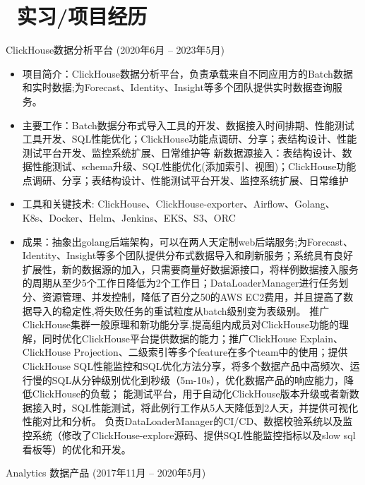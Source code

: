 \documentclass{resume}
\begin{document}
\section{\faUsers\ 实习/项目经历}
ClickHouse数据分析平台 (2020年6月 -- 2023年5月)
\begin{itemize}
  \item 项目简介：ClickHouse数据分析平台，负责承载来自不同应用方的Batch数据和实时数据;为Forecast、Identity、Insight等多个团队提供实时数据查询服务。
  \item 主要工作：Batch数据分布式导入工具的开发、数据接入时间排期、性能测试工具开发、SQL性能优化；ClickHouse功能点调研、分享；表结构设计、性能测试平台开发、监控系统扩展、日常维护等
  新数据源接入：表结构设计、数据性能测试、schema升级、SQL性能优化(添加索引、视图)；ClickHouse功能点调研、分享；表结构设计、性能测试平台开发、监控系统扩展、日常维护
  \item 工具和关键技术: ClickHouse、ClickHouse-exporter、Airflow、Golang、K8s、Docker、Helm、Jenkins、EKS、S3、ORC
  \item 成果：抽象出golang后端架构，可以在两人天定制web后端服务;为Forecast、Identity、Insight等多个团队提供分布式数据导入和刷新服务；系统具有良好扩展性，新的数据源的加入，只需要商量好数据源接口，将样例数据接入服务的周期从至少5个工作日降低为2个工作日；DataLoaderManager进行任务划分、资源管理、并发控制，降低了百分之50的AWS EC2费用，并且提高了数据导入的稳定性,将失败任务的重试粒度从batch级别变为表级别。
  推广ClickHouse集群一般原理和新功能分享,提高组内成员对ClickHouse功能的理解，同时优化ClickHouse平台提供数据的能力；推广ClickHouse Explain、ClickHouse Projection、二级索引等多个feature在多个team中的使用；提供ClickHouse SQL性能监控和SQL优化方法分享，将多个数据产品中高频次、运行慢的SQL从分钟级别优化到秒级（5m-10s），优化数据产品的响应能力，降低ClickHouse的负载；
  能测试平台，用于自动化ClickHouse版本升级或者新数据接入时，SQL性能测试，将此例行工作从5人天降低到2人天，并提供可视化性能对比和分析。
  负责DataLoaderManager的CI/CD、数据校验系统以及监控系统（修改了ClickHouse-explore源码、提供SQL性能监控指标以及slow sql看板等）的优化和开发。
\end{itemize}
Analytics 数据产品 (2017年11月 -- 2020年5月)
\end{document}
